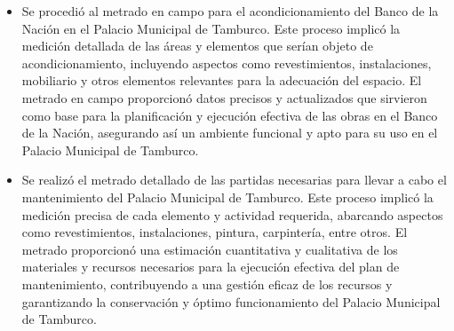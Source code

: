 \begin{itemize}
	\item Se procedió al metrado en campo para el acondicionamiento del Banco de la Nación en el Palacio Municipal de Tamburco. Este proceso implicó la medición detallada de las áreas y elementos que serían objeto de acondicionamiento, incluyendo aspectos como revestimientos, instalaciones, mobiliario y otros elementos relevantes para la adecuación del espacio. El metrado en campo proporcionó datos precisos y actualizados que sirvieron como base para la planificación y ejecución efectiva de las obras en el Banco de la Nación, asegurando así un ambiente funcional y apto para su uso en el Palacio Municipal de Tamburco.
	\item Se realizó el metrado detallado de las partidas necesarias para llevar a cabo el mantenimiento del Palacio Municipal de Tamburco. Este proceso implicó la medición precisa de cada elemento y actividad requerida, abarcando aspectos como revestimientos, instalaciones, pintura, carpintería, entre otros. El metrado proporcionó una estimación cuantitativa y cualitativa de los materiales y recursos necesarios para la ejecución efectiva del plan de mantenimiento, contribuyendo a una gestión eficaz de los recursos y garantizando la conservación y óptimo funcionamiento del Palacio Municipal de Tamburco.
\end{itemize}

